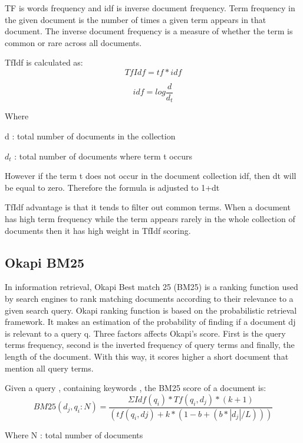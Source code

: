 TF is words frequency and idf is inverse document frequency. Term frequency in the given document is the number of times a given term appears in that document. The inverse document frequency is a measure of whether the term is common or rare across all documents.

TfIdf  is calculated as:
\begin{equation}
	TfIdf = tf * idf
\end{equation}

\begin{equation}
	idf = log \frac{ d }{ d_t}
\end{equation}

Where

d : total number of documents in the collection

$d_t$ : total number of documents where term t occurs

However if the term t does not occur in the document collection idf, then dt will be equal to zero. Therefore the formula is adjusted to 1+dt

TfIdf advantage is that it tends to filter out common terms. When a document has high term frequency while the term appears rarely in the whole collection of documents then it has high weight in TfIdf scoring.


\subsection{Okapi BM25}

In information retrieval, Okapi Best match 25 (BM25)  is a ranking function used by search engines to rank matching documents according to their relevance to a given search query. Okapi ranking function is based on the probabilistic retrieval framework. It makes an estimation of the probability of finding if a document dj is relevant to a query q. Three factors affects Okapi's score. First is the query terms frequency, second is the inverted frequency of query terms and finally, the length of the document. With this way, it scores higher a short document that mention all query terms.

Given a query , containing keywords , the BM25 score of a document is:
\begin{equation}
BM25(d_j,q_i:N) = \frac{ ΣIdf(q_i)*Tf(q_i, d_j)*(k + 1) } { ( tf(q_i, dj)+k* (1-b+(b*|d_j|/L))) }
\end{equation}

Where
N : total number of documents

